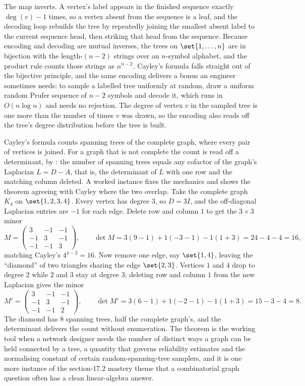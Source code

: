 

The map inverts. A vertex's label appears in the finished sequence
exactly $\deg(v) - 1$ times, so a vertex absent from the sequence is a
leaf, and the decoding loop rebuilds the tree by repeatedly joining the
smallest absent label to the current sequence head, then striking that
head from the sequence. Because encoding and decoding are mutual
inverses, the trees on $\set{1, \ldots, n}$ are in bijection with the
length-$(n-2)$ strings over an $n$-symbol alphabet, and the product
rule counts those strings as $n^{n-2}$. Cayley's formula falls straight
out of the bijective principle, and the same encoding delivers a bonus
an engineer sometimes needs: to sample a labelled tree uniformly at
random, draw a uniform random Prufer sequence of $n - 2$ symbols and
decode it, which runs in $O(n \log n)$ and needs no rejection. The
degree of vertex $v$ in the sampled tree is one more than the number of
times $v$ was drawn, so the encoding also reads off the tree's degree
distribution before the tree is built.

Cayley's formula counts spanning trees of the complete graph, where
every pair of vertices is joined. For a graph that is not complete
the count is read off a determinant, by : the number of spanning trees equals any
cofactor of the graph's Laplacian $L = D - A$, that is, the
determinant of $L$ with one row and the matching column deleted. A
worked instance fixes the mechanics and shows the theorem agreeing
with Cayley where the two overlap. Take the complete graph $K_{4}$ on
$\set{1, 2, 3, 4}$. Every vertex has degree $3$, so $D = 3 I$, and
the off-diagonal Laplacian entries are $-1$ for each edge. Delete row
and column $1$ to get the $3 \times 3$ minor
\[
M = \begin{pmatrix}
3 & -1 & -1 \\
-1 & 3 & -1 \\
-1 & -1 & 3
\end{pmatrix},
\qquad \det M = 3(9 - 1) + 1(-3 - 1) - 1(1 + 3) = 24 - 4 - 4 = 16,
\]
matching Cayley's $4^{4-2} = 16$. Now remove one edge, say
$\set{1, 4}$, leaving the ``diamond'' of two triangles sharing the
edge $\set{2, 3}$. Vertices $1$ and $4$ drop to degree $2$ while $2$
and $3$ stay at degree $3$; deleting row and column $1$ from the new
Laplacian gives the minor
\[
M' = \begin{pmatrix}
3 & -1 & -1 \\
-1 & 3 & -1 \\
-1 & -1 & 2
\end{pmatrix},
\qquad \det M' = 3(6 - 1) + 1(-2 - 1) - 1(1 + 3) = 15 - 3 - 4 = 8.
\]
The diamond has $8$ spanning trees, half the complete graph's, and
the determinant delivers the count without enumeration. The theorem
is the working tool when a network designer needs the number of
distinct ways a graph can be held connected by a tree, a quantity
that governs reliability estimates and the normalising constant of
certain random-spanning-tree samplers, and it is one more instance of
the section-17.2 mastery theme that a combinatorial graph question
often has a clean linear-algebra answer.

